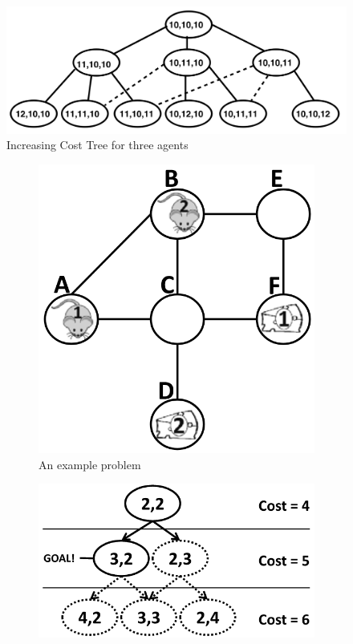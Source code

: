 \documentclass[english]{article}
\begin{document}
	\begin{figure}[t]
		\centering
		\includegraphics[width=0.5\linewidth]{img/ict}
		\caption{Increasing Cost Tree for three agents \cite{sharon2011}}
		\label{fig:ict}
		\vspace{-30pt}
	\end{figure}
	\begin{figure}
		
	\end{figure}
	
	
	\begin{figure}[b]
		\centering
		\begin{subfigure}{0.2\textwidth}
			\centering
			\includegraphics[width=\linewidth]{img/mdds1}
			\caption{An example problem}
			\label{fig:problem}
		\end{subfigure}
		\hfill
		\begin{subfigure}{0.3\textwidth}
			\centering
			\includegraphics[width=\linewidth]{img/ict2}

\end{subfigure}
\end{figure}
\end{document}

